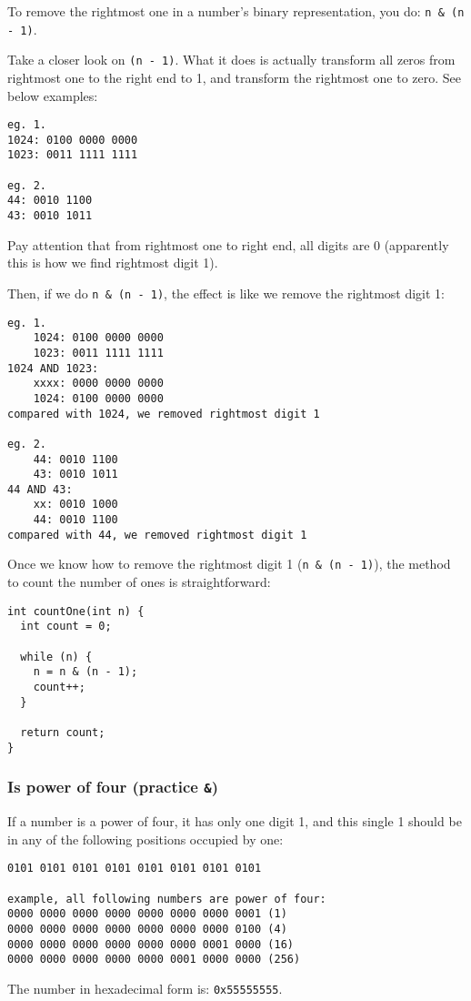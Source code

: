 \documentclass[12pt]{article}
\begin{document}
To remove the rightmost one in a number's binary representation, you do: \texttt{n \& (n - 1)}.

Take a closer look on \texttt{(n - 1)}. What it does is actually transform all zeros from rightmost one to the right end to 1, and transform the rightmost one to zero. See below examples:
\begin{verbatim}
eg. 1.
1024: 0100 0000 0000
1023: 0011 1111 1111

eg. 2.
44: 0010 1100
43: 0010 1011
\end{verbatim}
Pay attention that from rightmost one to right end, all digits are 0 (apparently this is how we find rightmost digit 1).

Then, if we do \texttt{n \& (n - 1)}, the effect is like we remove the rightmost digit 1:
\begin{verbatim}
eg. 1.
    1024: 0100 0000 0000
    1023: 0011 1111 1111
1024 AND 1023:
    xxxx: 0000 0000 0000
    1024: 0100 0000 0000
compared with 1024, we removed rightmost digit 1

eg. 2.
    44: 0010 1100
    43: 0010 1011
44 AND 43:
    xx: 0010 1000
    44: 0010 1100
compared with 44, we removed rightmost digit 1
\end{verbatim}

Once we know how to remove the rightmost digit 1 (\texttt{n \& (n - 1)}), the method to count the number of ones is straightforward:
\begin{verbatim}
int countOne(int n) {
  int count = 0;

  while (n) {
    n = n & (n - 1);
    count++;
  }

  return count;
}
\end{verbatim}
\subsubsection{Is power of four (practice \texttt{\&})}
\label{sec:orge6ebc82}
If a number is a power of four, it has only one digit 1, and this single 1 should be in any of the following positions occupied by one:
\begin{verbatim}
0101 0101 0101 0101 0101 0101 0101 0101

example, all following numbers are power of four:
0000 0000 0000 0000 0000 0000 0000 0001 (1)
0000 0000 0000 0000 0000 0000 0000 0100 (4)
0000 0000 0000 0000 0000 0000 0001 0000 (16)
0000 0000 0000 0000 0000 0001 0000 0000 (256)
\end{verbatim}
The number in hexadecimal form is: \texttt{0x55555555}.
\end{document}
